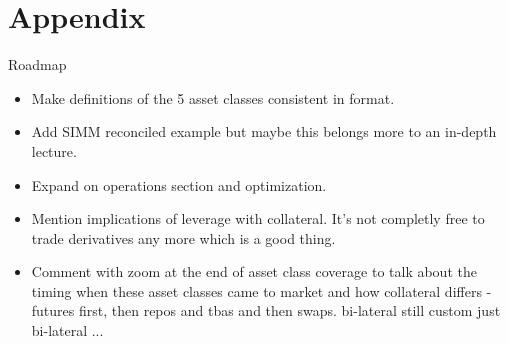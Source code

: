 \documentclass[handout, aspectratio=169]{beamer}
\begin{document}
\section*{Appendix}
\begin{frame}{Roadmap}
  \begin{itemize}
    \item Make definitions of the 5 asset classes consistent in format.
    \item Add SIMM reconciled example but maybe this belongs more to an in-depth lecture.
    \item Expand on operations section and optimization.
    \item Mention implications of leverage with collateral. It's not completly free to trade derivatives any more which is a good thing.
    \item Comment with zoom at the end of asset class coverage to talk about the timing when these asset classes came to market and how collateral differs - futures first, then repos and tbas and then swaps. bi-lateral still custom just bi-lateral ...
  \end{itemize}
\end{frame}
\end{document}
